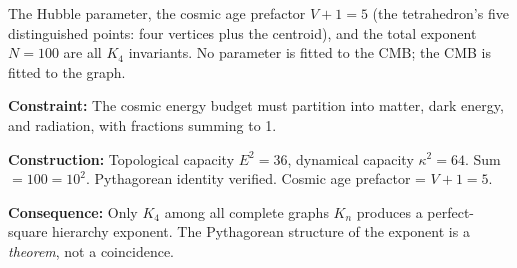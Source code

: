 \documentclass[11pt,a4paper]{book}
\begin{document}
The Hubble parameter, the cosmic age prefactor $V + 1 = 5$ (the tetrahedron's five distinguished points: four vertices plus the centroid), and the total exponent $N = 100$ are all $K_4$ invariants. No parameter is fitted to the CMB; the CMB is fitted to the graph.

\textbf{Constraint:} The cosmic energy budget must partition into matter, dark energy, and radiation, with fractions summing to 1.

\textbf{Construction:} Topological capacity $E^2 = 36$, dynamical capacity $\kappa^2 = 64$. Sum $= 100 = 10^2$. Pythagorean identity verified. Cosmic age prefactor = $V + 1 = 5$.

\textbf{Consequence:} Only $K_4$ among all complete graphs $K_n$ produces a perfect-square hierarchy exponent. The Pythagorean structure of the exponent is a \emph{theorem}, not a coincidence.
\end{document}
